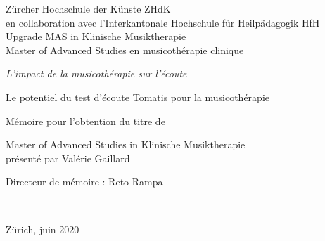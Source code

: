 
\begin{titlepage}
 \begin{center}
    \Large
     Zürcher Hochschule der Künste ZHdK\\
 	en collaboration avec l'Interkantonale Hochschule für
        Heilpädagogik HfH \\
	 Upgrade MAS in Klinische Musiktherapie \\ Master of Advanced Studies en musicothérapie clinique\\
  \vfill
  { \LARGE
\emph{ L'impact de la musicothérapie sur l'écoute}\\ \bigskip


Le potentiel du test d'écoute Tomatis pour la musicothérapie} \vfill

Mémoire pour l'obtention du titre de

Master of Advanced Studies in Klinische Musiktherapie \\ présenté par Valérie Gaillard

{\large Directeur de mémoire : Reto Rampa}



	 \hfill \\
	 \rule{0mm}{1pt} \hfill
{\large Zürich, juin 2020}
 \end{center}
\end{titlepage}
